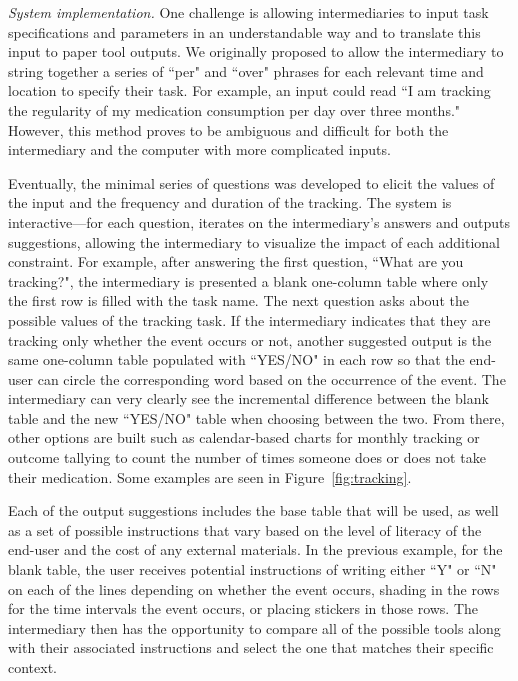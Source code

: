 \documentclass{sig-alternate}
\begin{document}

\emph{System implementation.}
One challenge is allowing intermediaries to input task specifications and parameters in an understandable way and to translate this input to paper tool outputs. We originally proposed to allow the intermediary to string together a series of ``per" and ``over" phrases for each relevant time and location to specify their task. For example, an input could read ``I am tracking the regularity of my medication consumption per day over three months." However, this method proves to be ambiguous and difficult for both the intermediary and the computer with more complicated inputs. 

Eventually, the minimal series of questions was developed to elicit the values of the input and the frequency and duration of the tracking. The system is interactive---for each question, \nifty iterates on the intermediary's answers and outputs suggestions, allowing the intermediary to visualize the impact of each additional constraint. For example, after answering the first question, ``What are you tracking?", the intermediary is presented a blank one-column table where only the first row is filled with the task name. The next question asks about the possible values of the tracking task. If the intermediary indicates that they are tracking only whether the event occurs or not, another suggested output is the same one-column table populated with ``YES/NO" in each row so that the end-user can circle the corresponding word based on the occurrence of the event. The intermediary can very clearly see the incremental difference between the blank table and the new ``YES/NO" table when choosing between the two. From there, other options are built such as calendar-based charts for monthly tracking or outcome tallying to count the number of times someone does or does not take their medication. Some examples are seen in Figure~\ref{fig:tracking}.

Each of the output suggestions includes the base table that will be used, as well as a set of possible instructions that vary based on the level of literacy of the end-user and the cost of any external materials. In the previous example, for the blank table, the user receives potential instructions of writing either ``Y" or ``N" on each of the lines depending on whether the event occurs, shading in the rows for the time intervals the event occurs, or placing stickers in those rows.  The intermediary then has the opportunity to compare all of the possible tools along with their associated instructions and select the one that matches their specific context. 
\end{document}
